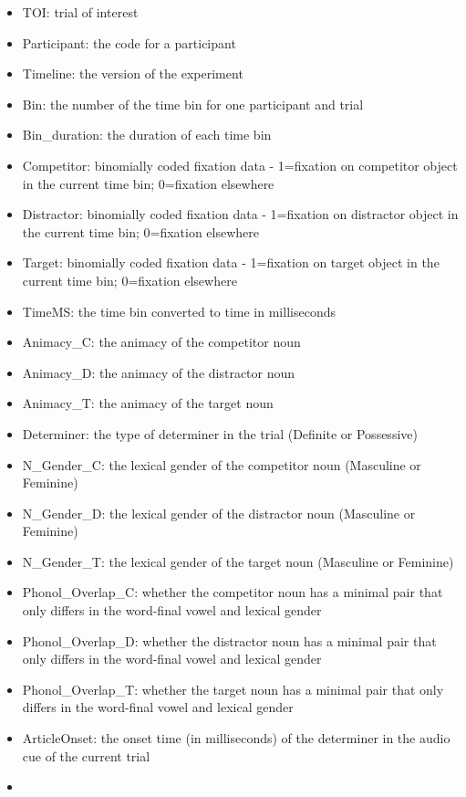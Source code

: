 \documentclass[
]{article}
\begin{document}
\begin{itemize}
\item
  TOI: trial of interest
\item
  Participant: the code for a participant
\item
  Timeline: the version of the experiment
\item
  Bin: the number of the time bin for one participant and trial
\item
  Bin\_duration: the duration of each time bin
\item
  Competitor: binomially coded fixation data - 1=fixation on competitor
  object in the current time bin; 0=fixation elsewhere
\item
  Distractor: binomially coded fixation data - 1=fixation on distractor
  object in the current time bin; 0=fixation elsewhere
\item
  Target: binomially coded fixation data - 1=fixation on target object
  in the current time bin; 0=fixation elsewhere
\item
  TimeMS: the time bin converted to time in milliseconds
\item
  Animacy\_C: the animacy of the competitor noun
\item
  Animacy\_D: the animacy of the distractor noun
\item
  Animacy\_T: the animacy of the target noun
\item
  Determiner: the type of determiner in the trial (Definite or
  Possessive)
\item
  N\_Gender\_C: the lexical gender of the competitor noun (Masculine or
  Feminine)
\item
  N\_Gender\_D: the lexical gender of the distractor noun (Masculine or
  Feminine)
\item
  N\_Gender\_T: the lexical gender of the target noun (Masculine or
  Feminine)
\item
  Phonol\_Overlap\_C: whether the competitor noun has a minimal pair
  that only differs in the word-final vowel and lexical gender
\item
  Phonol\_Overlap\_D: whether the distractor noun has a minimal pair
  that only differs in the word-final vowel and lexical gender
\item
  Phonol\_Overlap\_T: whether the target noun has a minimal pair that
  only differs in the word-final vowel and lexical gender
\item
  ArticleOnset: the onset time (in milliseconds) of the determiner in
  the audio cue of the current trial
\item

\end{itemize}
\end{document}
